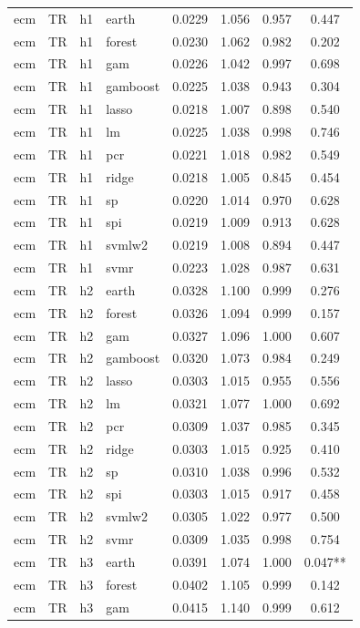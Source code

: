 \begin{ThreePartTable}
\begin{longtable}[t]{llclcccc}
\addlinespace
ecm & TR & h1 & earth & 0.0229 & 1.056 & 0.957 & 0.447\\
ecm & TR & h1 & forest & 0.0230 & 1.062 & 0.982 & 0.202\\
ecm & TR & h1 & gam & 0.0226 & 1.042 & 0.997 & 0.698\\
ecm & TR & h1 & gamboost & 0.0225 & 1.038 & 0.943 & 0.304\\
ecm & TR & h1 & lasso & 0.0218 & 1.007 & 0.898 & 0.540\\
ecm & TR & h1 & lm & 0.0225 & 1.038 & 0.998 & 0.746\\
ecm & TR & h1 & pcr & 0.0221 & 1.018 & 0.982 & 0.549\\
ecm & TR & h1 & ridge & 0.0218 & 1.005 & 0.845 & 0.454\\
ecm & TR & h1 & sp & 0.0220 & 1.014 & 0.970 & 0.628\\
ecm & TR & h1 & spi & 0.0219 & 1.009 & 0.913 & 0.628\\
ecm & TR & h1 & svmlw2 & 0.0219 & 1.008 & 0.894 & 0.447\\
ecm & TR & h1 & svmr & 0.0223 & 1.028 & 0.987 & 0.631\\
\addlinespace
ecm & TR & h2 & earth & 0.0328 & 1.100 & 0.999 & 0.276\\
ecm & TR & h2 & forest & 0.0326 & 1.094 & 0.999 & 0.157\\
ecm & TR & h2 & gam & 0.0327 & 1.096 & 1.000 & 0.607\\
ecm & TR & h2 & gamboost & 0.0320 & 1.073 & 0.984 & 0.249\\
ecm & TR & h2 & lasso & 0.0303 & 1.015 & 0.955 & 0.556\\
ecm & TR & h2 & lm & 0.0321 & 1.077 & 1.000 & 0.692\\
ecm & TR & h2 & pcr & 0.0309 & 1.037 & 0.985 & 0.345\\
ecm & TR & h2 & ridge & 0.0303 & 1.015 & 0.925 & 0.410\\
ecm & TR & h2 & sp & 0.0310 & 1.038 & 0.996 & 0.532\\
ecm & TR & h2 & spi & 0.0303 & 1.015 & 0.917 & 0.458\\
ecm & TR & h2 & svmlw2 & 0.0305 & 1.022 & 0.977 & 0.500\\
ecm & TR & h2 & svmr & 0.0309 & 1.035 & 0.998 & 0.754\\
\addlinespace
ecm & TR & h3 & earth & 0.0391 & 1.074 & 1.000 & 0.047**\\
ecm & TR & h3 & forest & 0.0402 & 1.105 & 0.999 & 0.142\\
ecm & TR & h3 & gam & 0.0415 & 1.140 & 0.999 & 0.612\\

\end{longtable}
\end{ThreePartTable}
